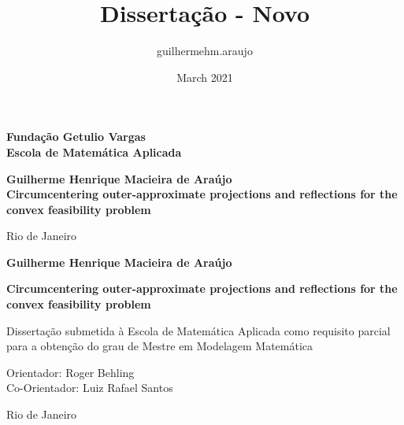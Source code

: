 \documentclass[smallextended,numbook,nospthms]{svjour3}
\title{Dissertação - Novo}
\author{guilhermehm.araujo }
\date{March 2021}
\theoremstyle{plain}
\theoremstyle{definition}
\begin{document}
\thispagestyle{empty}
\begin{center}
\textbf{\LARGE Fundação Getulio Vargas}\\ 
\textbf{\LARGE Escola de Matemática Aplicada}

\par
\vspace{170pt}
\textbf{\Large Guilherme Henrique Macieira de Araújo}\\
\vspace{32pt}
\textbf{\Large Circumcentering outer-approximate projections and reflections for the convex feasibility problem}\\
\end{center}

\par
\vfill
\begin{center}
{{\normalsize Rio de Janeiro}\\
{\normalsize \the\year}}
\end{center}

\newpage
\thispagestyle{empty}

\newpage
\begin{center}
\textbf{\LARGE Guilherme Henrique Macieira de Araújo}

\par
\vspace{200pt}
\textbf{\Large Circumcentering outer-approximate projections and reflections for the convex feasibility problem}
\end{center}

\par
\vspace{85pt}
\hspace*{175pt}\parbox{7.6cm}{{\normalsize Dissertação submetida à Escola de Matemática Aplicada como requisito parcial para a obtenção do grau de Mestre em Modelagem Matemática}}


\par
\vspace{1em}
\hspace*{125pt}\parbox{10.0cm}{{\normalsize Orientador: Roger Behling}\\
{\normalsize Co-Orientador: Luiz Rafael Santos}}

\par
\vfill
\begin{center}
{{\normalsize Rio de Janeiro}\\
{\normalsize \the\year}}
\end{center}
\end{document}
